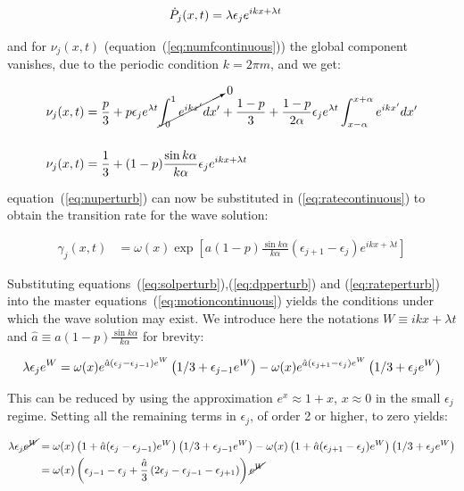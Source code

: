\begin{align}
    \dot{P}_j(x,t) &= \lambda\epsilon_j e^{ikx + \lambda t}
    \label{eq:dpperturb}
\end{align}

\noindent and for $\nu_j(x,t)$ (equation~(\ref{eq:numfcontinuous})) the global component vanishes, due to the periodic condition
$k=2\pi m$, and we get:

\begin{align}
    \nu_j(x,t) &= \frac{p}{3} + p\epsilon_je^{\lambda t}\cancelto{0}{\int_0^1 e^{ikx'}dx'} +
    \frac{1-p}{3} + \frac{1-p}{2\alpha} \epsilon_je^{\lambda t}\int_{x-\alpha}^{x+\alpha}e^{ikx'}dx' \notag\\[14pt]
    \nu_j(x,t) &= \frac{1}{3} + (1-p)\frac{\sin k\alpha}{k\alpha}\epsilon_je^{ikx+\lambda t}
    \label{eq:nuperturb}
\end{align}

\noindent equation~(\ref{eq:nuperturb}) can now be substituted in (\ref{eq:ratecontinuous}) to obtain the transition rate for the wave
solution:

\begin{align}
    \gamma_j(x,t) &= \omega(x)\exp\left[ a(1-p)\frac{\sin k\alpha}{k\alpha}(\epsilon_{j+1}-\epsilon_j)e^{ikx+\lambda t} \right]
    \label{eq:rateperturb}
\end{align}

Substituting equations~(\ref{eq:solperturb}),(\ref{eq:dpperturb}) and (\ref{eq:rateperturb}) into the master
equations~(\ref{eq:motioncontinuous}) yields the conditions under which the wave solution may exist. We introduce here the notations
$W\equiv ikx + \lambda t$ and $\hat{a}\equiv a(1-p)\frac{\sin k\alpha}{k\alpha}$ for brevity:

\begin{align}
    \lambda \epsilon_je^W = \omega(x)e^{\hat{a}(\epsilon_j-\epsilon_{j-1})e^W}\left(1/3+\epsilon_{j-1}e^W\right)
    - \omega(x)e^{\hat{a}(\epsilon_{j+1}-\epsilon_j)e^W}\left(1/3+\epsilon_je^W\right) \notag
\end{align}

\noindent This can be reduced by using the approximation $e^x \approx 1 + x$, $x\approx 0$ in the small $\epsilon_j$ regime. Setting
all the remaining terms in $\epsilon_j$, of order 2 or higher, to zero yields:

\begin{align}
    \lambda \epsilon_j\cancel{e^W} &= \omega(x)\left(1+\hat{a}(\epsilon_j-\epsilon_{j-1})e^W\right)\left(1/3+\epsilon_{j-1}e^W\right)
    - \omega(x)\left(1+\hat{a}(\epsilon_{j+1}-\epsilon_j)e^W\right)\left(1/3+\epsilon_je^W\right) \notag \\
    &= \omega(x)\left( \epsilon_{j-1} - \epsilon_j + \frac{\hat{a}}{3}\left( 2\epsilon_j - \epsilon_{j-1} - \epsilon_{j+1} \right) \right)\cancel{e^W} \notag
\end{align}

